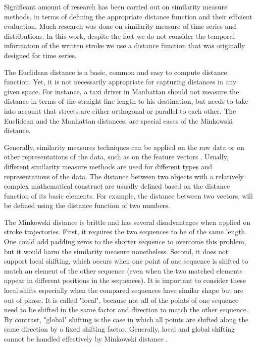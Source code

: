 \iftoggle{edit-mode}{\hspace{0pt}\marginpar{Previous research}}{}
Significant amount of research has been carried out on similarity measure methods, in terms of defining the appropriate distance function and their efficient evaluation. 
Much research was done on similarity measure of time series and distributions. 
In this work, despite the fact we do not consider the temporal information of the written stroke we use a distance function that was originally designed for time series.

\iftoggle{edit-mode}{\hspace{0pt}\marginpar{Euclidean and Manhattan}}{}
The Euclidean distance is a basic, common and easy to compute distance function. 
Yet, it is not necessarily appropriate for capturing distances in any given space. 
For instance, a taxi driver in Manhattan should not measure the distance in terms of the straight line length to his destination, but needs to take into account that streets are either orthogonal or parallel to each other.
The Euclidean and the Manhattan distances, are special cases of the Minkowski distance.

\iftoggle{edit-mode}{\hspace{0pt}\marginpar{Different Representations}}{}
Generally, similarity measures techniques can be applied on the raw data or on other representations of the data, such as on the feature vectors \cite{chen2005similarity}. 
Usually, different similarity measure methods are used for different types and representations of the data. 
The distance between two objects with a relatively complex mathematical construct are usually defined based on the distance function of its basic elements. 
For example, the distance between two vectors, will be defined using the distance function of two numbers. 

\iftoggle{edit-mode}{\hspace{0pt}\marginpar{Drawbacks of the Minkowski distance}}{}
The Minkowski distance is brittle and has several disadvantages when applied on stroke trajectories.
First, it requires the two sequences to be of the same length. 
One could add padding zeros to the shorter sequence to overcome this problem, but it would harm the similarity measure nonetheless. 
Second, it does not support local shifting, which occurs when one point of one sequence is shifted to match an element of the other sequence (even when the two matched elements appear in different positions in the sequences). 
It is important to consider these local shifts especially when the compared sequences have similar shape but are out of phase. 
It is called "local", because not all of the points of one sequence need to be shifted in the same factor and direction to match the other sequence. 
By contrast, "global" shifting is the case in which all points are shifted along the same direction by a fixed shifting factor. 
Generally, local and global shifting cannot be handled effectively by Minkowski distance \cite{chen2005similarity}.


